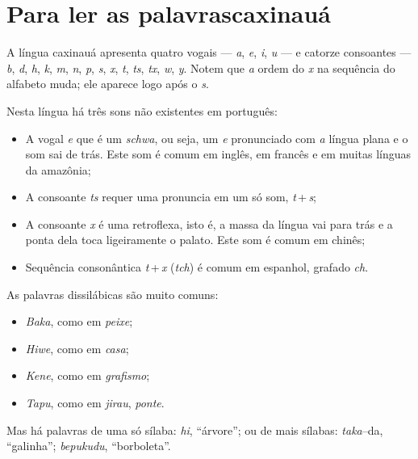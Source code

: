 \chapter[Para ler as palavras caxinauá]{Para ler as palavras\break caxinauá}

A língua caxinauá apresenta quatro vogais --- \textit{a}, \textit{e}, \textit{i}, \textit{u} --- e catorze consoantes --- \textit{b}, \textit{d}, \textit{h}, \textit{k}, \textit{m}, \textit{n}, \textit{p}, \textit{s}, \textit{x}, \textit{t}, \textit{ts}, \textit{tx}, \textit{w}, \textit{y}. Notem que \textit{a} ordem do \textit{x} na sequência do alfabeto muda;
ele aparece logo após o \textit{s}.

Nesta língua há três sons não existentes em português:

\begin{itemize}
\item A vogal \textit{e} que é um \textit{schwa}, ou seja, um \textit{e} pronunciado com \textit{a} língua plana e o som sai de trás. Este som é comum em inglês, em francês e em muitas línguas da amazônia;

\item A consoante \textit{ts} requer uma pronuncia em um só som, \textit{t}\,+\,\textit{s};

\item A consoante \textit{x} é uma retroflexa, isto é, a massa da língua vai para trás e a ponta dela toca ligeiramente o palato. Este som é comum em chinês;

\item Sequência consonântica \textit{t}\,+\,\textit{x} (\textit{tch}) é comum em espanhol, grafado \textit{ch}.
\end{itemize}

As palavras dissilábicas são muito comuns:

\begin{itemize}
\item \textit{Baka}, como em \textit{peixe};
\item \textit{Hiwe}, como em \textit{casa};
\item \textit{Kene}, como em \textit{grafismo};
\item \textit{Tapu}, como em \textit{jirau}, \textit{ponte}.
\end{itemize}

Mas há palavras de uma só sílaba: \textit{hi}, ``árvore''; ou de mais sílabas: \textit{taka}--da, ``galinha''; \textit{bepukudu}, ``borboleta''.


